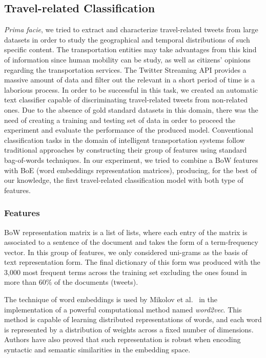 \subsection{Travel-related Classification}
\label{sec:travel_classification}

\emph{Prima facie}, we tried to extract and characterize travel-related tweets from large datasets in order to study the geographical and temporal distributions of such specific content. The transportation entities may take advantages from this kind of information since human mobility can be study, as well as citizens' opinions regarding the transportation services. The Twitter Streaming \gls{API} provides a massive amount of data and filter out the relevant in a short period of time is a laborious process. In order to be successful in this task, we created an automatic text classifier capable of discriminating travel-related tweets from non-related ones. Due to the absence of gold standard datasets in this domain, there was the need of creating a training and testing set of data in order to proceed the experiment and evaluate the performance of the produced model. Conventional classification tasks in the domain of intelligent transportation systems follow traditional approaches by constructing their group of features using standard bag-of-words techniques. In our experiment, we tried to combine a \gls{BoW} features with \gls{BoE} (word embeddings representation matrices), producing, for the best of our knowledge, the first travel-related classification model with both type of features.

\subsubsection{Features}
\label{sec:travel_features}
\gls{BoW} representation matrix is a list of lists, where each entry of the matrix is associated to a sentence of the document and takes the form of a term-frequency vector. In this group of features, we only considered uni-grams as the basis of text representation form. The final dictionary of this form was produced with the 3,000 most frequent terms across the training set excluding the ones found in more than 60$\%$ of the documents (tweets).

The technique of word embeddings is used by Mikolov et al.~\cite{mikolov2013efficient} in the implementation of a powerful computational method named \emph{word2vec}. This method is capable of learning distributed representations of words, and each word is represented by a distribution of weights across a fixed number of dimensions. Authors have also proved that such representation is robust when encoding syntactic and semantic similarities in the embedding space.


